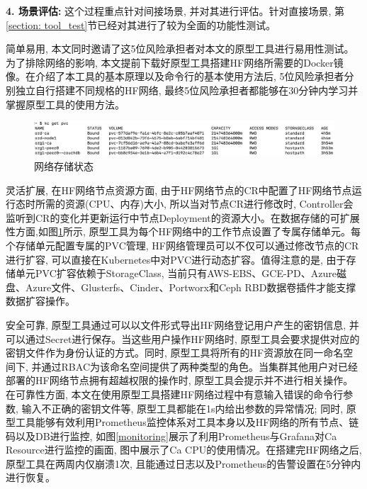 \textbf{4. 场景评估: }这个过程重点针对间接场景, 并对其进行评估。针对直接场景, 第\ref{section: tool_test}节已经对其进行了较为全面的功能性测试。

简单易用, 本文同时邀请了这5位风险承担者对本文的原型工具进行易用性测试。为了排除网络的影响,
本文提前下载好原型工具搭建HF网络所需要的Docker镜像。在介绍了本工具的基本原理以及命令行的基本使用方法后, 5位风险承担者分别独立自行搭建不同规格的HF网络, 最终5位风险承担者都能够在30分钟内学习并掌握原型工具的使用方法。


\begin{figure}[h] %
    \centering %
    \includegraphics[width=1.0\textwidth]{FIGs/chapter6/db.png} %
    \caption{网络存储状态} %
    \label{db} %
\end{figure}%

灵活扩展, 在HF网络节点资源方面, 由于HF网络节点的CR中配置了HF网络节点运行态时所需的资源(CPU、内存)大小, 所以当对节点CR进行修改时, Controller会监听到CR的变化并更新运行中节点Deployment的资源大小。在数据存储的可扩展性方面,如图\ref{db}所示, 原型工具为每个HF网络中的工作节点设置了专属存储单元。每个存储单元配置专属的PVC管理, HF网络管理员可以不仅可以通过修改节点的CR进行扩容, 可以直接在Kubernetes中对PVC进行动态扩容。值得注意的是, 由于存储单元PVC扩容依赖于StorageClass, 当前只有AWS-EBS、GCE-PD、Azure磁盘、Azure文件、Glusterfs、Cinder、Portworx和Ceph RBD数据卷插件才能支撑数据扩容操作。


安全可靠, 原型工具通过可以以文件形式导出HF网络登记用户产生的密钥信息, 并可以通过Secret进行保存。当这些用户操作HF网络时, 原型工具会要求提供对应的密钥文件作为身份认证的方式。同时, 原型工具将所有的HF资源放在同一命名空间下, 并通过RBAC为该命名空间提供了两种类型的角色。当集群其他用户对已经部署的HF网络节点拥有超越权限的操作时, 原型工具会提示并不进行相关操作。在可靠性方面, 本文在使用原型工具搭建HF网络过程中有意输入错误的命令行参数, 输入不正确的密钥文件等, 原型工具都能在1s内给出参数的异常情况; 同时, 原型工具能够有效利用Prometheus监控体系对工具本身以及HF网络的所有节点、链码以及DB进行监控, 如图\ref{monitoring}展示了利用Prometheus与Grafana对Ca Resource进行监控的画面, 图中展示了Ca CPU的使用情况。在搭建完HF网络之后, 原型工具在两周内仅崩溃1次, 且能通过日志以及Prometheus的告警设置在5分钟内进行恢复。

